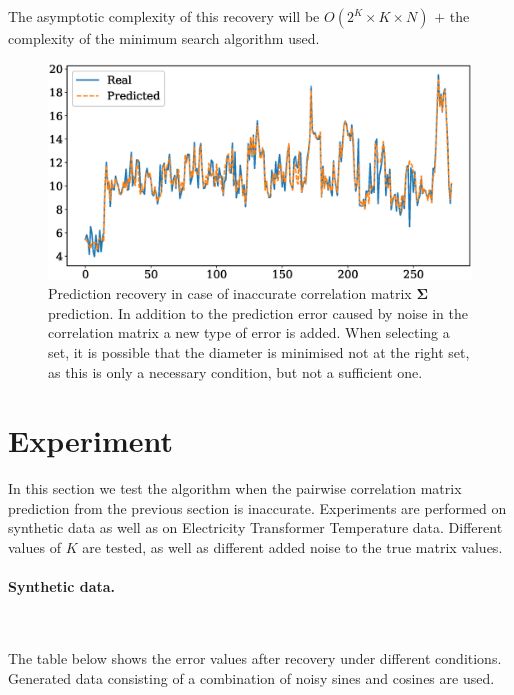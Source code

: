 \documentclass{article}
\begin{document}
{The asymptotic complexity of this recovery will be $O(2^K \times K \times N)$ $+$ the complexity of the minimum search algorithm used.
\begin{figure}[H]
	\centering
	\includegraphics[width=\textwidth]{NonIdealRecovery.eps}
	\caption{Prediction recovery in case of inaccurate correlation matrix $\mathbf{\Sigma}$ prediction. In addition to the prediction error caused by noise in the correlation matrix a new type of error is added. When selecting a set, it is possible that the diameter is minimised not at the right set, as this is only a necessary condition, but not a sufficient one.}
	\label{fig:fig4}
\end{figure}

\section{Experiment}

In this section we test the algorithm when the pairwise correlation matrix prediction from the previous section is inaccurate. Experiments are performed on synthetic data as well as on Electricity Transformer Temperature \cite{zhou2021informer} data. Different values of $K$ are tested, as well as different added noise to the true matrix values.

\paragraph{Synthetic data.}\

The table below shows the error values after recovery under different conditions. Generated data consisting of a combination of noisy sines and cosines are used.

}
\end{document}

